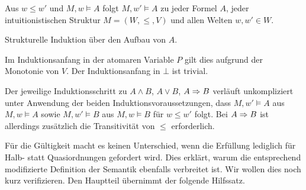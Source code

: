 \begin{Satz}
Aus $w\le w'$ und $M,w\models A$ folgt $M,w'\models A$ zu jeder Formel
$A$, jeder intuitionistischen Struktur $M=(W,\le,V)$ und allen Welten $w,w'\in W$.
\end{Satz}
\begin{Beweis}[Beweisskizze]
Strukturelle Induktion über den Aufbau von $A$.

Im Induktionsanfang in der atomaren Variable $P$ gilt dies aufgrund
der Monotonie von $V$. Der Induktionsanfang in $\bot$ ist trivial.

Der jeweilige Induktionsschritt zu $A\land B$, $A\lor B$, $A\Rightarrow B$
verläuft unkompliziert unter Anwendung der beiden Induktionsvoraussetzungen,
dass $M,w'\models A$ aus $M,w\models A$ sowie $M,w'\models B$ aus
$M,w\models B$ für $w\le w'$ folgt. Bei $A\Rightarrow B$ ist
allerdings zusätzlich die Transitivität von $\le$ erforderlich.\,\qedsymbol
\end{Beweis}

\noindent
Für die Gültigkeit macht es keinen Unterschied, wenn die Erfüllung
lediglich für Halb- statt Quasiordnungen gefordert wird. Dies erklärt,
warum die entsprechend modifizierte Definition der Semantik ebenfalls
verbreitet ist. Wir wollen dies noch kurz verifizieren. Den Hauptteil
übernimmt der folgende Hilfssatz.

